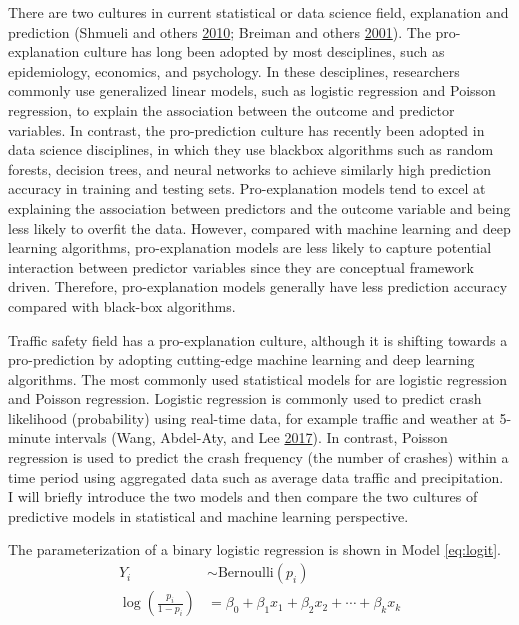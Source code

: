 \documentclass[12pt]{book}
\numberwithin{equation}{chapter}
\begin{document}
There are two cultures in current statistical or data science field, explanation and prediction (Shmueli and others \protect\hyperlink{ref-shmueli2010explain}{2010}; Breiman and others \protect\hyperlink{ref-breiman2001statistical}{2001}). The pro-explanation culture has long been adopted by most desciplines, such as epidemiology, economics, and psychology. In these desciplines, researchers commonly use generalized linear models, such as logistic regression and Poisson regression, to explain the association between the outcome and predictor variables. In contrast, the pro-prediction culture has recently been adopted in data science disciplines, in which they use blackbox algorithms such as random forests, decision trees, and neural networks to achieve similarly high prediction accuracy in training and testing sets. Pro-explanation models tend to excel at explaining the association between predictors and the outcome variable and being less likely to overfit the data. However, compared with machine learning and deep learning algorithms, pro-explanation models are less likely to capture potential interaction between predictor variables since they are conceptual framework driven. Therefore, pro-explanation models generally have less prediction accuracy compared with black-box algorithms.

Traffic safety field has a pro-explanation culture, although it is shifting towards a pro-prediction by adopting cutting-edge machine learning and deep learning algorithms. The most commonly used statistical models for are logistic regression and Poisson regression. Logistic regression is commonly used to predict crash likelihood (probability) using real-time data, for example traffic and weather at 5-minute intervals (Wang, Abdel-Aty, and Lee \protect\hyperlink{ref-wang2017safety}{2017}). In contrast, Poisson regression is used to predict the crash frequency (the number of crashes) within a time period using aggregated data such as average data traffic and precipitation. I will briefly introduce the two models and then compare the two cultures of predictive models in statistical and machine learning perspective.

The parameterization of a binary logistic regression is shown in Model \eqref{eq:logit}.
\begin{equation}
\begin{split}
Y_i & \sim \text{Bernoulli}(p_i) \\
\log(\frac{p_i}{1 - p_i}) & = \beta_0 + \beta_1x_1 + \beta_2x_2 + \cdots + \beta_kx_k
\label{eq:logit}
\end{split}
\end{equation}
\end{document}

